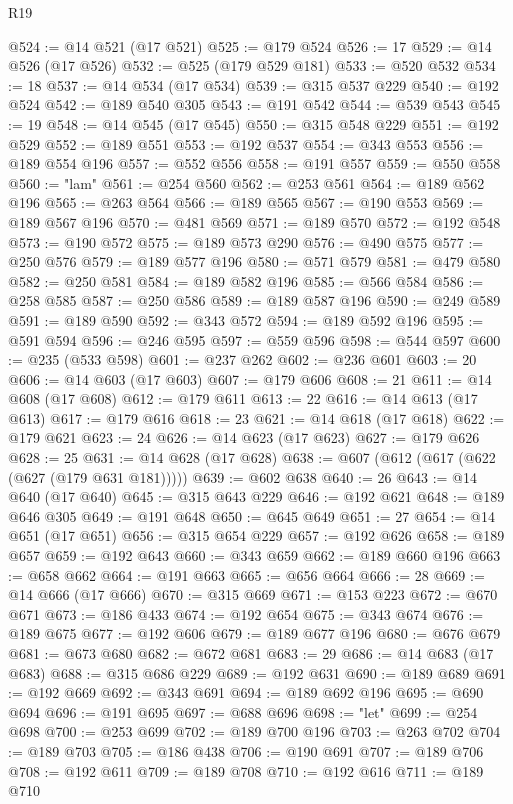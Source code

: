 \begin{lexlean}{R19}
\begin{coremodule}
@524 := @14 @521 (@17 @521)
@525 := @179 @524
@526 := 17
@529 := @14 @526 (@17 @526)
@532 := @525 (@179 @529 @181)
@533 := @520 @532
@534 := 18
@537 := @14 @534 (@17 @534)
@539 := @315 @537 @229
@540 := @192 @524
@542 := @189 @540 @305
@543 := @191 @542
@544 := @539 @543
@545 := 19
@548 := @14 @545 (@17 @545)
@550 := @315 @548 @229
@551 := @192 @529
@552 := @189 @551
@553 := @192 @537
@554 := @343 @553
@556 := @189 @554 @196
@557 := @552 @556
@558 := @191 @557
@559 := @550 @558
@560 := "lam"
@561 := @254 @560
@562 := @253 @561
@564 := @189 @562 @196
@565 := @263 @564
@566 := @189 @565
@567 := @190 @553
@569 := @189 @567 @196
@570 := @481 @569
@571 := @189 @570
@572 := @192 @548
@573 := @190 @572
@575 := @189 @573 @290
@576 := @490 @575
@577 := @250 @576
@579 := @189 @577 @196
@580 := @571 @579
@581 := @479 @580
@582 := @250 @581
@584 := @189 @582 @196
@585 := @566 @584
@586 := @258 @585
@587 := @250 @586
@589 := @189 @587 @196
@590 := @249 @589
@591 := @189 @590
@592 := @343 @572
@594 := @189 @592 @196
@595 := @591 @594
@596 := @246 @595
@597 := @559 @596
@598 := @544 @597
@600 := @235 (@533 @598)
@601 := @237 @262
@602 := @236 @601
@603 := 20
@606 := @14 @603 (@17 @603)
@607 := @179 @606
@608 := 21
@611 := @14 @608 (@17 @608)
@612 := @179 @611
@613 := 22
@616 := @14 @613 (@17 @613)
@617 := @179 @616
@618 := 23
@621 := @14 @618 (@17 @618)
@622 := @179 @621
@623 := 24
@626 := @14 @623 (@17 @623)
@627 := @179 @626
@628 := 25
@631 := @14 @628 (@17 @628)
@638 := @607 (@612 (@617 (@622 (@627 (@179 @631 @181)))))
@639 := @602 @638
@640 := 26
@643 := @14 @640 (@17 @640)
@645 := @315 @643 @229
@646 := @192 @621
@648 := @189 @646 @305
@649 := @191 @648
@650 := @645 @649
@651 := 27
@654 := @14 @651 (@17 @651)
@656 := @315 @654 @229
@657 := @192 @626
@658 := @189 @657
@659 := @192 @643
@660 := @343 @659
@662 := @189 @660 @196
@663 := @658 @662
@664 := @191 @663
@665 := @656 @664
@666 := 28
@669 := @14 @666 (@17 @666)
@670 := @315 @669
@671 := @153 @223
@672 := @670 @671
@673 := @186 @433
@674 := @192 @654
@675 := @343 @674
@676 := @189 @675
@677 := @192 @606
@679 := @189 @677 @196
@680 := @676 @679
@681 := @673 @680
@682 := @672 @681
@683 := 29
@686 := @14 @683 (@17 @683)
@688 := @315 @686 @229
@689 := @192 @631
@690 := @189 @689
@691 := @192 @669
@692 := @343 @691
@694 := @189 @692 @196
@695 := @690 @694
@696 := @191 @695
@697 := @688 @696
@698 := "let"
@699 := @254 @698
@700 := @253 @699
@702 := @189 @700 @196
@703 := @263 @702
@704 := @189 @703
@705 := @186 @438
@706 := @190 @691
@707 := @189 @706
@708 := @192 @611
@709 := @189 @708
@710 := @192 @616
@711 := @189 @710

\end{coremodule}
\end{lexlean}
